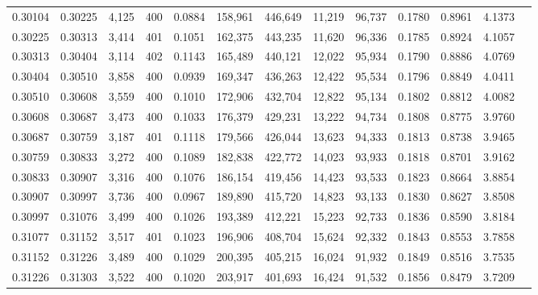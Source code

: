 \begin{tabular}{rrrrrrrrrrrrr}
0.30104 & 0.30225 &  4,125 & 400 &                                     0.0884 & 158,961 & 446,649 &  11,219 &  96,737 & 0.1780 & 0.8961 & 4.1373 \\
0.30225 & 0.30313 &  3,414 & 401 &                                     0.1051 & 162,375 & 443,235 &  11,620 &  96,336 & 0.1785 & 0.8924 & 4.1057 \\
0.30313 & 0.30404 &  3,114 & 402 &                                     0.1143 & 165,489 & 440,121 &  12,022 &  95,934 & 0.1790 & 0.8886 & 4.0769 \\
0.30404 & 0.30510 &  3,858 & 400 &                                     0.0939 & 169,347 & 436,263 &  12,422 &  95,534 & 0.1796 & 0.8849 & 4.0411 \\
0.30510 & 0.30608 &  3,559 & 400 &                                     0.1010 & 172,906 & 432,704 &  12,822 &  95,134 & 0.1802 & 0.8812 & 4.0082 \\
0.30608 & 0.30687 &  3,473 & 400 &                                     0.1033 & 176,379 & 429,231 &  13,222 &  94,734 & 0.1808 & 0.8775 & 3.9760 \\
0.30687 & 0.30759 &  3,187 & 401 &                                     0.1118 & 179,566 & 426,044 &  13,623 &  94,333 & 0.1813 & 0.8738 & 3.9465 \\
0.30759 & 0.30833 &  3,272 & 400 &                                     0.1089 & 182,838 & 422,772 &  14,023 &  93,933 & 0.1818 & 0.8701 & 3.9162 \\
0.30833 & 0.30907 &  3,316 & 400 &                                     0.1076 & 186,154 & 419,456 &  14,423 &  93,533 & 0.1823 & 0.8664 & 3.8854 \\
0.30907 & 0.30997 &  3,736 & 400 &                                     0.0967 & 189,890 & 415,720 &  14,823 &  93,133 & 0.1830 & 0.8627 & 3.8508 \\
0.30997 & 0.31076 &  3,499 & 400 &                                     0.1026 & 193,389 & 412,221 &  15,223 &  92,733 & 0.1836 & 0.8590 & 3.8184 \\
0.31077 & 0.31152 &  3,517 & 401 &                                     0.1023 & 196,906 & 408,704 &  15,624 &  92,332 & 0.1843 & 0.8553 & 3.7858 \\
0.31152 & 0.31226 &  3,489 & 400 &                                     0.1029 & 200,395 & 405,215 &  16,024 &  91,932 & 0.1849 & 0.8516 & 3.7535 \\
0.31226 & 0.31303 &  3,522 & 400 &                                     0.1020 & 203,917 & 401,693 &  16,424 &  91,532 & 0.1856 & 0.8479 & 3.7209 \\

\end{tabular}
